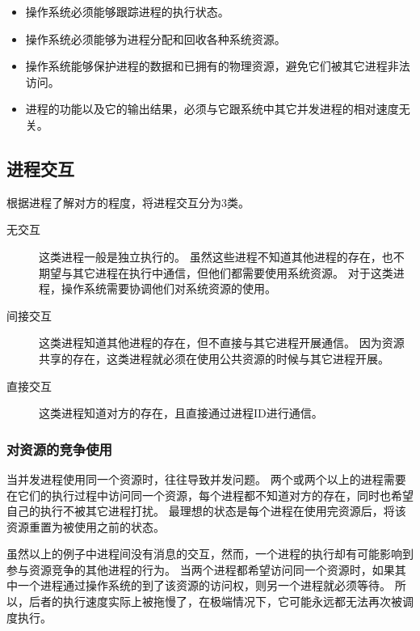 {{        \begin{itemize}
            \item 操作系统必须能够跟踪进程的执行状态。
            \item 操作系统必须能够为进程分配和回收各种系统资源。
            \item 操作系统能够保护进程的数据和已拥有的物理资源，避免它们被其它进程非法访问。
            \item 进程的功能以及它的输出结果，必须与它跟系统中其它并发进程的相对速度无关。
        \end{itemize}
    }

    \subsection{进程交互}
    {
        根据进程了解对方的程度，将进程交互分为3类。

        \begin{description}
            \item[无交互]
            {
                这类进程一般是独立执行的。
                虽然这些进程不知道其他进程的存在，也不期望与其它进程在执行中通信，但他们都需要使用系统资源。
                对于这类进程，操作系统需要协调他们对系统资源的使用。
            }
            \item[间接交互]
            {
                这类进程知道其他进程的存在，但不直接与其它进程开展通信。
                因为资源共享的存在，这类进程就必须在使用公共资源的时候与其它进程开展。
            }
            \item[直接交互]
            {
                这类进程知道对方的存在，且直接通过进程ID进行通信。
            }
        \end{description}

        \subsubsection{对资源的竞争使用}
        {
            当并发进程使用同一个资源时，往往导致并发问题。
            两个或两个以上的进程需要在它们的执行过程中访问同一个资源，每个进程都不知道对方的存在，同时也希望自己的执行不被其它进程打扰。
            最理想的状态是每个进程在使用完资源后，将该资源重置为被使用之前的状态。

            虽然以上的例子中进程间没有消息的交互，然而，一个进程的执行却有可能影响到参与资源竞争的其他进程的行为。
            当两个进程都希望访问同一个资源时，如果其中一个进程通过操作系统的到了该资源的访问权，则另一个进程就必须等待。
            所以，后者的执行速度实际上被拖慢了，在极端情况下，它可能永远都无法再次被调度执行。

}}}
